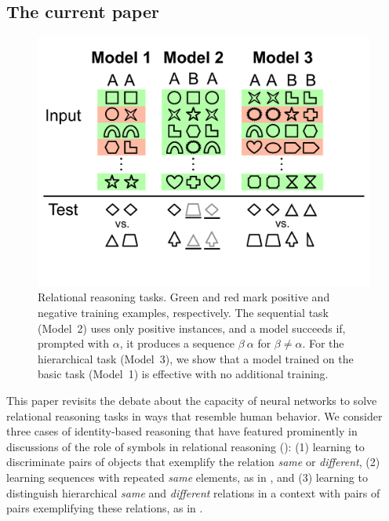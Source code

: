 \documentclass[9pt,twocolumn,twoside,lineno]{pnas-new}
\begin{document}
\subsection*{The current paper}

\begin{figure}[tp]
  \centering
  \includegraphics[scale=0.20]{modelfigv1.pdf}
  \caption{Relational reasoning tasks. Green and red mark positive and negative training examples, respectively. The sequential task (Model~2) uses only positive instances, and a model succeeds if, prompted with $\alpha$, it produces a sequence $\beta \ \alpha$ for $\beta \neq \alpha$. For the hierarchical task (Model~3), we show that a model trained on the basic task (Model~1) is effective with no additional training.}
  \label{fig:tasks}
\end{figure}

This paper revisits the debate about the capacity of neural networks to solve relational reasoning tasks in ways that resemble human behavior. We consider three cases of identity-based reasoning that have featured prominently in discussions of the role of symbols in relational reasoning (): (1) learning to discriminate pairs of objects that exemplify the relation \emph{same} or \emph{different}, (2) learning sequences with repeated \emph{same} elements, as in \citet{marcus:1999}, and (3) learning to distinguish hierarchical \emph{same} and \emph{different} relations in a context with pairs of pairs exemplifying these relations, as in \citet{Premack:1983}.
\end{document}
